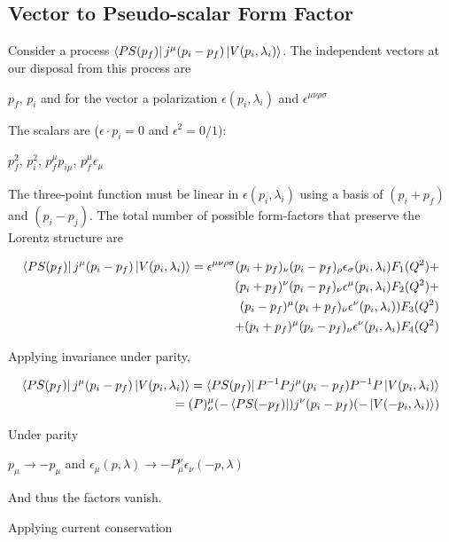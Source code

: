 \documentclass[10pt]{article}
\begin{document}
\subsection{Vector to Pseudo-scalar Form Factor}
Consider a process $\bra{PS(p_f)} j^{\mu}(p_i - p_f)\ket{V(p_i, \lambda_i)}$. The independent vectors at our disposal from this process are

\begin{center}
$p_f$, $p_i$ and for the vector a polarization $\epsilon(p_i, \lambda_i)$ and $\epsilon^{\mu\nu\rho\sigma}$
\end{center}

The scalars are ($\epsilon\cdot p_i = 0$ and $\epsilon^2 = 0/1$):

\begin{center}
$p_f^2$, $p_i^2$, $p_f^{\mu}p_{i\mu}$,  $p_{f}^{\mu}\epsilon_{\mu}$
\end{center}

The three-point function must be linear in $\epsilon(p_i, \lambda_i)$ using a basis of $(p_i+p_f)$ and $(p_i-p_j)$. The total number of possible form-factors that preserve the Lorentz structure are

\begin{align*}
\bra{PS(p_f)} j^{\mu}(p_i - p_f)\ket{V(p_i, \lambda_i)} = \epsilon^{\mu\nu\rho\sigma}(p_i + p_f)_{\nu}(p_i - p_f)_{\rho}\epsilon_{\sigma}(p_i, \lambda_i)F_1(Q^{2}) + \\ (p_i + p_f)^{\nu}(p_i - p_f)_{\nu}\epsilon^{\mu}(p_i, \lambda_i)F_2(Q^{2})+\\  (p_i - p_f)^{\mu}(p_i + p_f)_{\nu}\epsilon^{\nu}(p_i, \lambda_i))F_3(Q^{2})\\ + (p_i + p_f)^{\mu}(p_i - p_f)_{\nu}\epsilon^{\nu}(p_i, \lambda_i)F_4(Q^{2})
\end{align*}

Applying invariance under parity,

\begin{align*}
\bra{PS(p_f)} j^{\mu}(p_i - p_f)\ket{V(p_i, \lambda_i)} = \bra{PS(p_f)} P^{-1}P j^{\mu}(p_i - p_f) P^{-1}P \ket{V(p_i, \lambda_i)} \\ = (P)^{\mu}_{\nu}(-\bra{PS(-p_f)}) j^{\nu}( p_i - p_f)(-\ket{V(-p_i, \lambda_i)})
\end{align*}

Under parity

\begin{center}
$p_\mu \rightarrow -p_\mu$ and $\epsilon_{\mu}(p,\lambda) \rightarrow -P^{\nu}_{\mu}\epsilon_{\nu}(-p,\lambda)$
\end{center}
And thus the factors vanish. \par
Applying current conservation
\end{document}
